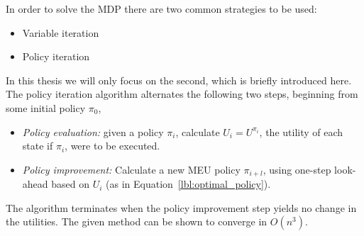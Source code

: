         In order to solve the MDP there are two common strategies to be used:
        \begin{itemize}
            \item Variable iteration
            \item Policy iteration
        \end{itemize}
        In this thesis we will only focus on the second, which is briefly introduced here. \\
        The policy iteration algorithm alternates the following two steps, beginning from some initial policy $\pi_0$,
        \begin{itemize}
            \item \emph{Policy evaluation:} given a policy $\pi_i$, calculate $U_i = U^{\pi_i}$, the utility of each state if $\pi_i$, were to be executed.
            \item \emph{Policy improvement:} Calculate a new MEU policy $\pi_{i+l}$, using one-step look-ahead based on $U_i$ (as in Equation~\ref{lbl:optimal_policy}).
        \end{itemize}
        The algorithm terminates when the policy improvement step yields no change in the utilities. The given method can be shown to converge in $O(n^3)$.



